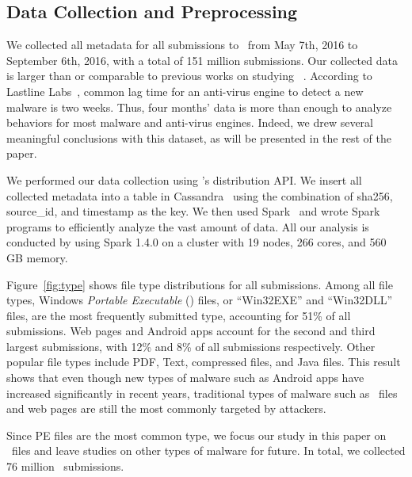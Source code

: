 

%

\subsection{Data Collection and Preprocessing}

We collected all metadata for all submissions to \vt\ from May 7th, 2016 to September 6th, 2016,
with a total of 151 million submissions. 
Our collected data is larger than or comparable to previous works on studying \vt~\cite{SongAPsys2016,huangvt2016bigdata}.
According to Lastline Labs~\cite{Lastline}, common lag time for an anti-virus engine to detect a new malware is two weeks.
Thus, four months' data is more than enough to analyze behaviors for most malware and anti-virus engines. 
Indeed, we drew several meaningful conclusions with this dataset, as will be presented in the rest of the paper.

We performed our data collection using \vt{}'s distribution API.
We insert all collected metadata into a table in Cassandra~\cite{cassandra} 
using the combination of sha256, source\_id, and timestamp as the key.
We then used Spark~\cite{spark} and wrote Spark programs to efficiently analyze the vast amount of data.
All our analysis is conducted by using Spark 1.4.0 on a cluster with 19 nodes, 266 cores, and 560 GB memory. 


Figure~\ref{fig:type} shows file type distributions for all submissions. 
Among all file types, Windows \textit{Portable Executable} ({\em \pe}) files, 
or ``Win32EXE'' and ``Win32DLL'' files, 
are the most frequently submitted type,
accounting for 51\% of all submissions.
Web pages and Android apps account for the second and third largest submissions, 
with 12\% and 8\% of all submissions respectively. 
Other popular file types include PDF, Text, compressed files, and Java files. 
This result shows that even though new types of malware such as Android apps have
increased significantly in recent years, 
traditional types of malware such as \pe\ files and web pages are still the 
most commonly targeted by attackers.

Since PE files are the most common type,
we focus our study in this paper on \pe\ files 
and leave studies on other types of malware for future. 
In total, we collected 76 million \pe\ submissions.


